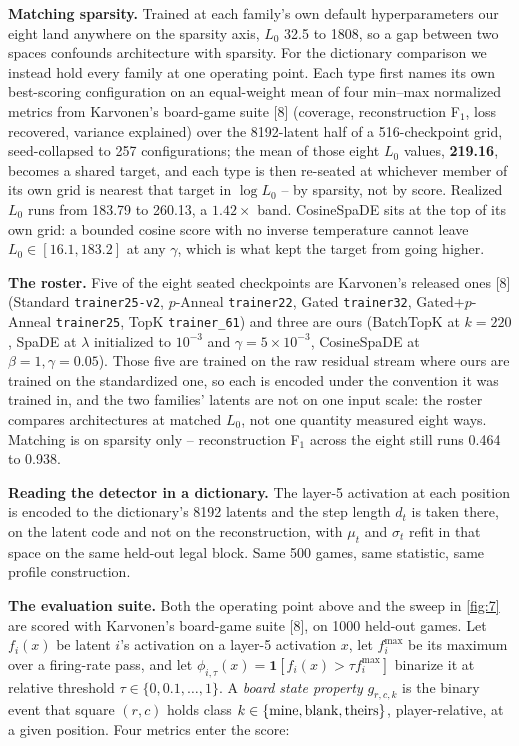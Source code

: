 \documentclass{article}
\begin{document}
\textbf{Matching sparsity.} Trained at each family's own default hyperparameters our eight land anywhere on the sparsity
axis, $L_0$ 32.5 to 1808, so a gap between two spaces confounds
architecture with sparsity. For the dictionary comparison we instead hold every family at one
operating point. Each type first names its own best-scoring configuration on an equal-weight mean
of four min--max normalized metrics from Karvonen's board-game suite [8] (coverage,
reconstruction F$_1$, loss recovered, variance explained) over the 8192-latent half of a 516-checkpoint grid, seed-collapsed to 257
configurations; the mean of those
eight $L_0$ values, \textbf{219.16}, becomes a shared target, and each type is then re-seated at
whichever member of its own grid is nearest that target in $\log L_0$ -- by sparsity, not by
score. Realized $L_0$ runs from 183.79 to 260.13, a $1.42\times$ band. CosineSpaDE sits at the top of its own grid: a bounded cosine score with no inverse
temperature cannot leave $L_0 \in [16.1, 183.2]$ at any $\gamma$, which is what kept the target
from going higher.

\textbf{The roster.} Five of the eight seated checkpoints are Karvonen's released ones [8] (Standard \texttt{trainer25-v2}, $p$-Anneal \texttt{trainer22},
Gated \texttt{trainer32}, Gated+$p$-Anneal \texttt{trainer25}, TopK \texttt{trainer\_61}) and
three are ours (BatchTopK at $k = 220$, SpaDE at $\lambda$ initialized to $10^{-3}$ and
$\gamma = 5\times10^{-3}$,
CosineSpaDE at $\beta = 1, \gamma = 0.05$). Those five are trained on the raw residual stream
where ours are trained on the standardized one, so each is encoded under the convention it was trained
in, and the two families' latents are not on one input scale: the roster compares architectures
at matched $L_0$, not one quantity measured eight ways. Matching is on sparsity only --
reconstruction F$_1$ across the eight still runs 0.464 to 0.938.

\textbf{Reading the detector in a dictionary.} The layer-5 activation at each position is encoded
to the dictionary's 8192 latents and the step length $d_t$ is taken there, on the latent
code and not on the reconstruction, with $\mu_t$ and $\sigma_t$ refit in that space on the
same held-out legal block. Same 500 games, same statistic, same profile construction.

\textbf{The evaluation suite.} Both the operating point above and the sweep in \cref{fig:7} are
scored with Karvonen's board-game suite [8], on 1000 held-out games. Let $f_i(x)$ be latent $i$'s
activation on a layer-5 activation $x$, let $f_i^{\max}$ be its maximum over a firing-rate pass,
and let $\phi_{i,\tau}(x) = \mathbf{1}[f_i(x) > \tau f_i^{\max}]$ binarize it at relative threshold
$\tau \in \{0, 0.1, \ldots, 1\}$. A \textit{board state property} $g_{r,c,k}$ is the binary event
that square $(r,c)$ holds class $k \in \{\rm mine, \rm blank, \rm theirs\}$, player-relative, at a
given position. Four metrics enter the score:
\end{document}
